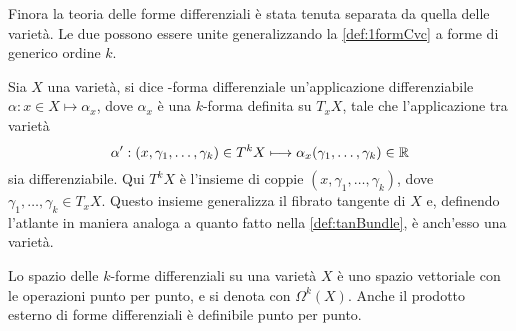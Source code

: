 Finora la teoria delle forme differenziali è stata tenuta separata da quella delle varietà. Le due possono essere unite generalizzando la \autoref{def:1formCvc} a forme di generico ordine $k$. 
\begin{definition}
  Sia $X$ una varietà, si dice -forma differenziale un'applicazione differenziabile $\alpha: x \in X \mapsto \alpha_x$, dove $\alpha_x$ è una $k$-forma definita su $T_x X$, tale che l'applicazione tra varietà \begin{equation*}
    \alpha': (x, \gamma_1, \ldots, \gamma_k) \in T^k X \longmapsto \alpha_x(\gamma_1, \ldots, \gamma_k) \in \mathbb{R}
  \end{equation*} 
  sia differenziabile. Qui $T^k X$ è l'insieme di coppie $(x, \gamma_1, \ldots, \gamma_k)$, dove $\gamma_1, \ldots,\gamma_k \in  T_x X$. Questo insieme generalizza il fibrato tangente di $X$ e, definendo l'atlante in maniera analoga a quanto fatto nella \autoref{def:tanBundle}, è anch'esso una varietà. 
\end{definition}
\begin{remark}
  Lo spazio delle $k$-forme differenziali su una varietà $X$ è uno spazio vettoriale con le operazioni punto per punto, e si denota con $\Omega^k (X)$. Anche il prodotto esterno di forme differenziali è definibile punto per punto.
\end{remark}


